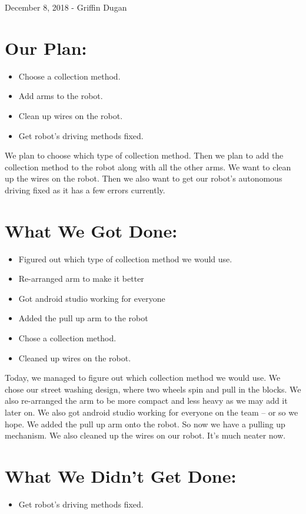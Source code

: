 \documentclass[12pt]{article}
\begin{document}
December 8, 2018 - Griffin Dugan

\section{Our Plan:} 
\begin{itemize}
	\item Choose a collection method.
	\item Add arms to the robot.
	\item Clean up wires on the robot.
	\item Get robot's driving methods fixed.
\end{itemize}

We plan to choose which type of collection method. Then we plan to add the collection method to the robot along with all the other arms. We want to clean up the wires on the robot. Then we also want to get our robot's autonomous driving fixed as it has a few errors currently.

\section{What We Got Done:} 
\begin{itemize}
	\item Figured out which type of collection method we would use.
	\item Re-arranged arm to make it better
	\item Got android studio working for everyone
	\item Added the pull up arm to the robot
	\item Chose a collection method.
	\item Cleaned up wires on the robot.
\end{itemize}

Today, we managed to figure out which collection method we would use. We chose our street washing design, where two wheels spin and pull in the blocks. We also re-arranged the arm to be more compact and less heavy as we may add it later on. We also got android studio working for everyone on the team -- or so we hope. We added the pull up arm onto the robot. So now we have a pulling up mechanism. We also cleaned up the wires on our robot. It's much neater now.

\section{What We Didn't Get Done:}
\begin{itemize}
	\item Get robot's driving methods fixed.
\end{itemize}
\end{document}
